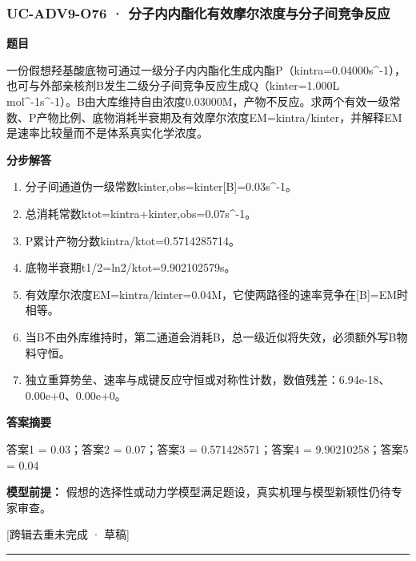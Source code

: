 \documentclass[UTF8,11pt,a4paper]{ctexart}
\begin{document}
\subsubsection*{UC-ADV9-O76 · 分子内内酯化有效摩尔浓度与分子间竞争反应}
\noindent\textbf{题目}\par
一份假想羟基酸底物可通过一级分子内内酯化生成内酯P（kintra=0.04000s\textasciicircum{}-1），也可与外部亲核剂B发生二级分子间竞争反应生成Q（kinter=1.000L mol\textasciicircum{}-1s\textasciicircum{}-1）。B由大库维持自由浓度0.03000M，产物不反应。求两个有效一级常数、P产物比例、底物消耗半衰期及有效摩尔浓度EM=kintra/kinter，并解释EM是速率比较量而不是体系真实化学浓度。\par
\medskip\noindent\textbf{分步解答}
\begin{enumerate}
\item 分子间通道伪一级常数kinter,obs=kinter[B]=0.03s\textasciicircum{}-1。
\item 总消耗常数ktot=kintra+kinter,obs=0.07s\textasciicircum{}-1。
\item P累计产物分数kintra/ktot=0.5714285714。
\item 底物半衰期t1/2=ln2/ktot=9.902102579s。
\item 有效摩尔浓度EM=kintra/kinter=0.04M，它使两路径的速率竞争在[B]=EM时相等。
\item 当B不由外库维持时，第二通道会消耗B，总一级近似将失效，必须额外写B物料守恒。
\item 独立重算势垒、速率与成键反应守恒或对称性计数，数值残差：6.94e-18、0.00e+0、0.00e+0。
\end{enumerate}
\noindent\textbf{答案摘要}\par
答案1 = 0.03；答案2 = 0.07；答案3 = 0.571428571；答案4 = 9.90210258；答案5 = 0.04\par
\noindent\textbf{模型前提：}
假想的选择性或动力学模型满足题设，真实机理与模型新颖性仍待专家审查。\par
\noindent\textcolor{red!65!black}{[跨辑去重未完成 · 草稿]} \par
\medskip\hrule\medskip
{}
\end{document}
